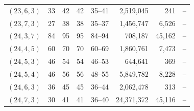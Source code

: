 {\begin{longtable}{lrrrrrrr}
$(23,6,3)$ & 33 & 42 & 42 & 35--41 & 2{,}519{,}045 & 241 & -- \\
$(23,7,3)$ & 27 & 38 & 38 & 35--37 & 1{,}456{,}747 & 6{,}526 & -- \\
$(24,3,7)$ & 84 & 95 & 95 & 84--94 & 708{,}187 & 45{,}162 & -- \\
$(24,4,5)$ & 60 & 70 & 70 & 60--69 & 1{,}860{,}761 & 7{,}473 & -- \\
$(24,5,3)$ & 46 & 54 & 54 & 46--53 & 644{,}641 & 369 & -- \\
$(24,5,4)$ & 46 & 56 & 56 & 48--55 & 5{,}849{,}782 & 8{,}228 & -- \\
$(24,6,3)$ & 36 & 45 & 45 & 36--44 & 2{,}062{,}478 & 313 & -- \\
$(24,7,3)$ & 30 & 41 & 41 & 36--40 & 24{,}371{,}372 & 45{,}116 & -- \\
\bottomrule
\end{longtable}}
